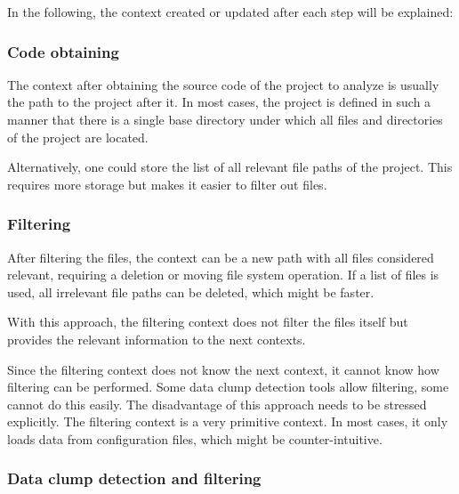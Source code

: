 


\hfill






In the following, the context created or updated after each step will be explained:

\subsubsection{Code obtaining}
The context after obtaining the source code of the project to analyze is usually the path to the project after it. In most cases, the project is defined in such a manner that there is a single base directory under which all files and directories of the project are located.

Alternatively, one could store the list of all relevant file paths of the project. This requires more storage but makes it easier to filter out files. 

\subsubsection{Filtering}
After filtering the files, the context can be a new path with all files considered relevant, requiring a deletion or moving file system operation. If a list of files is used, all irrelevant file paths can be deleted, which might be faster.



With this approach, the filtering context does not filter the files itself but provides the relevant information to the next contexts. 

Since the filtering context does not know the next context, it cannot know how filtering can be performed. Some data clump detection tools allow filtering, some cannot do this easily. The disadvantage of this approach needs to be stressed explicitly. The filtering context is a very primitive context. In most cases, it only loads data from configuration files, which might be counter-intuitive. 

\begin{comment}
\subsubsection{Extraction of AST}
\end{comment}
\subsubsection{Data clump detection and filtering}


